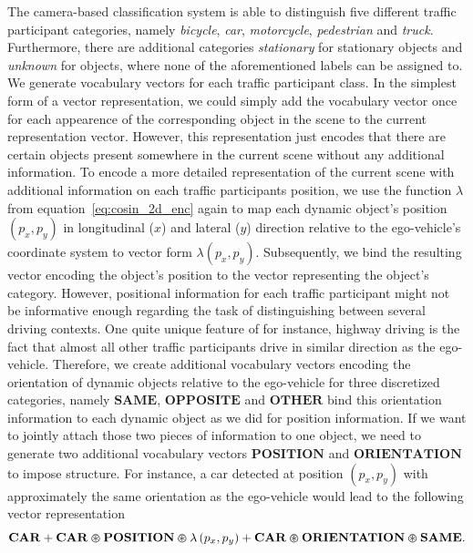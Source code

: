 The camera-based classification system is able to distinguish five different traffic participant categories, namely \emph{bicycle}, \emph{car}, \emph{motorcycle}, \emph{pedestrian} and \emph{truck}.
Furthermore, there are additional categories \emph{stationary} for stationary objects and \emph{unknown} for objects, where none of the aforementioned labels can be assigned to.
We generate vocabulary vectors for each traffic participant class.
In the simplest form of a vector representation, we could simply add the vocabulary vector once for each appearence of the corresponding object in the scene to the current representation vector. 
However, this representation just encodes that there are certain objects present somewhere in the current scene without any additional information.
To encode a more detailed representation of the current scene with additional information on each traffic participants position, we use the function $\lambda$ from equation~\eqref{eq:cosin_2d_enc} again to map each dynamic object's position $(p_x, p_y)$ in longitudinal ($x$) and lateral ($y$) direction relative to the ego-vehicle's coordinate system to vector form $ \lambda(p_x, p_y)$.
Subsequently, we bind the resulting vector encoding the object's position to the vector representing the object's category.
However, positional information for each traffic participant might not be informative enough regarding the task of distinguishing between several driving contexts.
One quite unique feature of for instance, highway driving is the fact that almost all other traffic participants drive in similar direction as the ego-vehicle.
Therefore, we create additional vocabulary vectors encoding the orientation of dynamic objects relative to the ego-vehicle for three discretized categories, namely $\mathbf{SAME}$, $\mathbf{OPPOSITE}$ and $\mathbf{OTHER}$  bind this orientation information to each dynamic object as we did for position information.
If we want to jointly attach those two pieces of information to one object, we need to generate two additional vocabulary vectors $\mathbf{POSITION}$ and $\mathbf{ORIENTATION }$ to impose structure.
For instance, a car detected at position $\left(p_x,p_y\right)$ with approximately the same orientation as the ego-vehicle would lead to the following vector representation
\begin{equation}
\label{eq:pos_orientation_context_class}
\mathbf{CAR} + \mathbf{CAR}\varoast\mathbf{POSITION}\varoast\lambda\left(p_x,p_y\right) + \mathbf{CAR}\varoast\mathbf{ORIENTATION}\varoast\mathbf{SAME}.
\end{equation}

